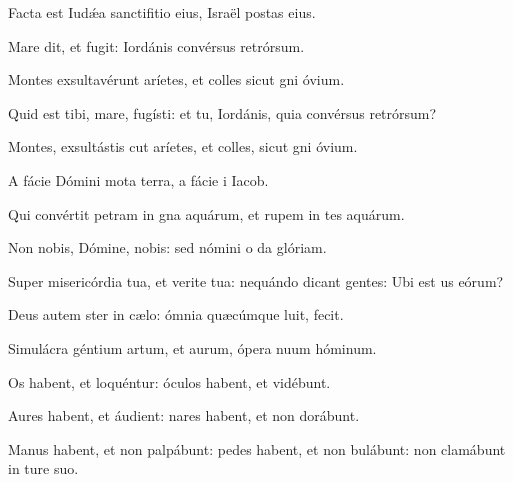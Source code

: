 \item {}

\item Facta est Iudǽa sanctifitio eius,\psstar{} Israël postas eius.

\item Mare dit, et fugit:\psstar{} Iordánis convérsus  retrórsum.

\item Montes exsultavérunt  aríetes,\psstar{} et colles sicut gni óvium.

\item Quid est tibi, mare,  fugísti:\psstar{} et tu, Iordánis, quia convérsus  retrórsum?

\item Montes, exsultástis cut aríetes,\psstar{} et colles, sicut gni óvium.

\item A fácie Dómini mota  terra,\psstar{} a fácie i Iacob.

\item Qui convértit petram in gna aquárum,\psstar{} et rupem in tes aquárum.

\item Non nobis, Dómine,  nobis:\psstar{} sed nómini o da glóriam.

\item Super misericórdia tua, et verite tua:\psstar{} nequándo dicant gentes: Ubi est us eórum?

\item Deus autem ster in cælo:\psstar{} ómnia quæcúmque luit, fecit.

\item Simulácra géntium artum, et aurum,\psstar{} ópera nuum hóminum.

\item Os habent, et  loquéntur:\psstar{} óculos habent, et  vidébunt.

\item Aures habent, et  áudient:\psstar{} nares habent, et non dorábunt.

\item Manus habent, et non palpábunt:\pscross{} pedes habent, et non bulábunt:\psstar{} non clamábunt in ture suo.

